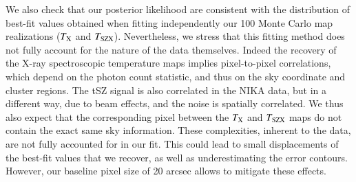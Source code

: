 \documentclass[twocolumn,traditabstract]{aa}
\newcommand{\ccor}[1]{\textcolor{Mypink}{#1}}
\def\TSZ {T_{\rm SZX}}
\def \TX {T_{\rm X}}
\begin{document}
\ccor{We also check that our posterior likelihood are consistent with the distribution of best-fit values obtained when fitting independently our 100 Monte Carlo map realizations ($\TX$ and $\TSZ$). Nevertheless, we stress that this fitting method does not fully account for the nature of the data themselves. Indeed the recovery of the X-ray spectroscopic temperature maps implies pixel-to-pixel correlations, which depend on the photon count statistic, and thus on the sky coordinate and cluster regions. The tSZ signal is also correlated in the NIKA data, but in a different way, due to beam effects, and the noise is spatially correlated. We thus also expect that the corresponding pixel between the $\TX$ and $\TSZ$ maps do not contain the exact same sky information. These complexities, inherent to the data, are not fully accounted for in our fit. This could lead to small displacements of the best-fit values that we recover, as well as underestimating the error contours. However, our baseline pixel size of 20 arcsec allows to mitigate these effects.}
\end{document}
